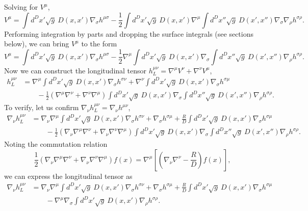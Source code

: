 \documentclass[10pt,letterpaper]{article}
\begin{document}
Solving for $V^\mu$,
\begin{equation}
V^{\mu} =   \int d^Dx' \sqrt{g}\ D(x,x') \nabla_\sigma h^{\mu\sigma} - \frac12
  \int d^Dx' \sqrt{g}\ D(x,x')\nabla^\mu   \int d^Dx'' \sqrt{g}\ D(x',x'') \nabla_\sigma\nabla_\rho h^{\sigma\rho}.
\end{equation}
Performing integration by parts and dropping the surface integrals (see sections below), we can bring $V^\mu$ to the form
\begin{equation}
V^{\mu} =   \int d^Dx' \sqrt{g}\ D(x,x') \nabla_\sigma h^{\mu\sigma} - \frac12\nabla^\mu 
  \int d^Dx' \sqrt{g}\ D(x,x')\nabla_\sigma   \int d^Dx'' \sqrt{g}\ D(x',x'') \nabla_\rho h^{\sigma\rho}.
\end{equation}
Now we can construct the longitudinal tensor $h^{\mu\nu}_L = \nabla^\mu V^\nu + \nabla^\nu V^\mu$, 
\begin{align}
  h^{\mu\nu}_L&=\nabla^\mu \int d^Dx' \sqrt{g}\ D(x,x')\nabla_\sigma h^{\sigma\nu} + \nabla^\nu \int d^Dx' \sqrt{g}\  D(x,x')\nabla_\sigma h^{\sigma\mu} 
\\
&\qquad -  
 \frac12(\nabla^\mu\nabla^\nu+\nabla^\nu\nabla^\mu) \int d^Dx'\sqrt{g}\  D(x,x') \nabla_\sigma \int d^Dx'' \sqrt{g}\ D(x',x'')\nabla_\rho h^{\sigma\rho}.
\end{align}
To verify, let us confirm $\nabla_\nu h^{\mu\nu}_L = \nabla_\nu h^{\mu\nu}$,
\begin{align}
\nabla_\nu h^{\mu\nu}_L &= \nabla_\nu \nabla^\mu \int d^Dx' \sqrt{g}\ D(x,x')\nabla_\sigma h^{\sigma\nu}
+ \nabla_\sigma h^{\sigma\mu} + \frac{R}{D}  \int d^Dx' \sqrt{g}\  D(x,x')\nabla_\sigma h^{\sigma\mu} 
\\
&\qquad - \frac12( \nabla_\nu \nabla^\mu \nabla^\nu + \nabla_\nu \nabla^\nu \nabla^\mu)  \int d^Dx'\sqrt{g}\  D(x,x') \nabla_\sigma \int d^Dx'' \sqrt{g}\ D(x',x'')\nabla_\rho h^{\sigma\rho}.
\end{align}
Noting the commutation relation
\begin{equation}
 \frac12( \nabla_\nu \nabla^\mu \nabla^\nu + \nabla_\nu \nabla^\nu \nabla^\mu)f(x) = 
\nabla^\mu \left[\left(\nabla_\nu\nabla^\nu - \frac{R}{D}\right)f(x)\right],
\end{equation}
we can express the longitudinal tensor as
\begin{align}
\nabla_\nu h^{\mu\nu}_L &= \nabla_\nu \nabla^\mu \int d^Dx' \sqrt{g}\ D(x,x')\nabla_\sigma h^{\sigma\nu}
+ \nabla_\sigma h^{\sigma\mu} + \frac{R}{D}  \int d^Dx' \sqrt{g}\  D(x,x')\nabla_\sigma h^{\sigma\mu} 
\nonumber
\\ &\qquad 
- \nabla^\mu \nabla_\sigma \int d^Dx' \sqrt{g}\ D(x,x')\nabla_\rho h^{\sigma\rho}.
\end{align}
\end{document}
